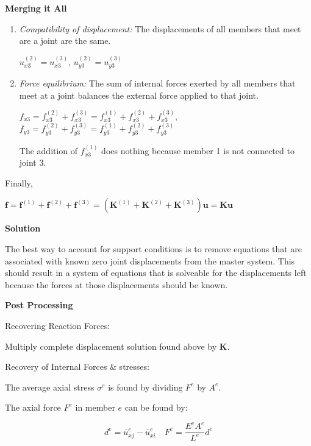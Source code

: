 \documentclass{article}
\begin{document}
\begin{multicols*}{2}
    \textbf{Merging it All}\par 
    \begin{enumerate}
        \item \textit{Compatibility of displacement:} The displacements of all 
                members that meet are a joint are the same.\par
                $u_{x3}^{(2)} = u_{x3}^{(3)}$, $u_{y3}^{(2)} = u_{y3}^{(3)}$
        \item \textit{Force equilibrium:} The sum of internal forces exerted by 
                all members that meet at a joint balances the external force 
                applied to that joint.\par 
                $f_{x3} = f_{x3}^{(2)}+f_{x3}^{(3)}=f_{x3}^{(1)}+f_{x3}^{(2)}+f_{x3}^{(3)}$, 
                $f_{y3} = f_{y3}^{(2)}+f_{y3}^{(3)}=f_{y3}^{(1)}+f_{y3}^{(2)}+f_{y3}^{(3)}$\par
                The addition of $f_{x3}^{(1)}$ does nothing because member 1 is
                not connected to joint 3.
    \end{enumerate}

    Finally, \par 
    $\textbf{f} = \textbf{f}^{(1)}+\textbf{f}^{(2)}+\textbf{f}^{(3)}=\left(\textbf{K}^{(1)}+\textbf{K}^{(2)}+\textbf{K}^{(3)}\right)\textbf{u} = \textbf{Ku}$

    \textbf{Solution}

    The best way to account for support conditions is to remove equations that
    are associated with known zero joint displacements from the master system.
    This should result in a system of equations that is solveable for the displacements
    left because the forces at those displacements should be known.

    \textbf{Post Processing}

    Recovering Reaction Forces:\par 
    Multiply complete displacement solution found above by \textbf{K}.\par 
    Recovery of Internal Forces \& stresses:\par 
    The average axial stress $\sigma^e$ is found by dividing $F^e$ by $A^e$.\par 
    The axial force $F^e$ in member $e$ can be found by:\par 
    \begin{equation*}
        d^e=\bar{u}_{xj}^e-\bar{u}_{xi}^e
        \quad
        F^e=\frac{E^eA^e}{L^e}d^e
    \end{equation*}


\end{multicols*}
\end{document}
